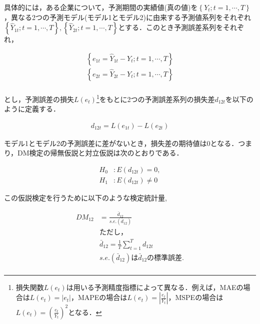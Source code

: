 \documentclass[a4paper，12pt]{jsarticle}
\begin{document}
具体的には，ある企業について，予測期間の実績値(真の値)を$\left\{Y_t; t=1, \cdots, T\right\}$，異なる2つの予測モデル(モデル1とモデル2)に由来する予測値系列をそれぞれ$\left\{\hat{Y}_{1t}; t=1, \cdots, T\right\}, \left\{\hat{Y}_{2t}; t=1, \cdots, T\right\}$とする．このとき予測誤差系列をそれぞれ，

\begin{equation}
  \begin{split}
    \left\{ e_{1t} = \hat{Y}_{1t} - Y_t ; t=1, \cdots, T \right\} \\
    \left\{ e_{2t} = \hat{Y}_{2t} - Y_t ; t=1, \cdots, T \right\} \\
  \end{split}
\end{equation}

\noindent
とし，予測誤差の損失$L(e_t)$\footnote{損失関数$L(e_t)$は用いる予測精度指標によって異なる．例えば，MAEの場合は$L(e_t)=|e_t|$，MAPEの場合は$L(e_t)=\left|\frac{e_t}{Y_t}\right|$，MSPEの場合は$L(e_t)=\left(\frac{e_t}{Y_t}\right)^2$となる．}をもとに2つの予測誤差系列の損失差$d_{12t}$を以下のように定義する．

\begin{equation}
  \begin{split}
    d_{12t} = L(e_{1t}) - L(e_{2t})
  \end{split}
\end{equation}

モデル1とモデル2の予測誤差に差がないとき，損失差の期待値は0となる．つまり，DM検定の帰無仮説と対立仮説は次のとおりである．

\begin{equation}
  \begin{split}
    H_0 &: E(d_{12t}) = 0,  \\
    H_1 &: E(d_{12t}) \neq 0
  \end{split}
\end{equation}

この仮説検定を行うために以下のような検定統計量,

\begin{equation}
  \begin{split}
    DM_{12} &= \frac {\bar{d}_{12}} {s.e.(\bar{d}_{12})} \\
    &ただし，\\
    &\bar{d}_{12} = \frac {1} {T} \sum^{T}_{t=1} d_{12t} \\
    &s.e.(\bar{d}_{12}) は\bar{d}_{12}の標準誤差.\\
  \end{split}
\end{equation}
\end{document}
